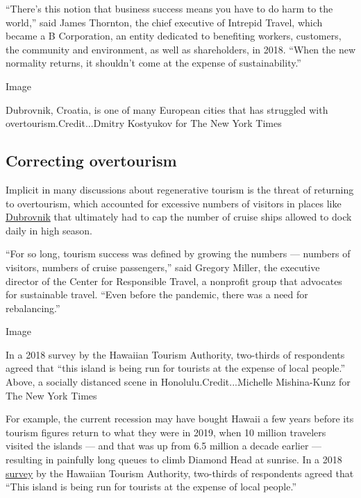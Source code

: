 ``There's this notion that business success means you have to do harm to
the world,'' said James Thornton, the chief executive of Intrepid
Travel, which became a B Corporation, an entity dedicated to benefiting
workers, customers, the community and environment, as well as
shareholders, in 2018. ``When the new normality returns, it shouldn't
come at the expense of sustainability.''

Image

Dubrovnik, Croatia, is one of many European cities that has struggled
with overtourism.Credit...Dmitry Kostyukov for The New York Times

\hypertarget{correcting-overtourism}{%
\subsection{Correcting overtourism}\label{correcting-overtourism}}

Implicit in many discussions about regenerative tourism is the threat of
returning to overtourism, which accounted for excessive numbers of
visitors in places like
\href{https://www.nytimes3xbfgragh.onion/2018/08/19/world/europe/dubrovnik-croatia-game-of-thrones.html}{Dubrovnik}
that ultimately had to cap the number of cruise ships allowed to dock
daily in high season.

``For so long, tourism success was defined by growing the numbers ---
numbers of visitors, numbers of cruise passengers,'' said Gregory
Miller, the executive director of the Center for Responsible Travel, a
nonprofit group that advocates for sustainable travel. ``Even before the
pandemic, there was a need for rebalancing.''

Image

In a 2018 survey by the Hawaiian Tourism Authority, two-thirds of
respondents agreed that ``this island is being run for tourists at the
expense of local people.'' Above, a socially distanced scene in
Honolulu.Credit...Michelle Mishina-Kunz for The New York Times

For example, the current recession may have bought Hawaii a few years
before its tourism figures return to what they were in 2019, when 10
million travelers visited the islands --- and that was up from 6.5
million a decade earlier --- resulting in painfully long queues to climb
Diamond Head at sunrise. In a 2018
\href{https://www.hawaiitourismauthority.org/media/2984/resident-sentiment-presentation-to-hta-board-01-31-2019.pdf}{survey}
by the Hawaiian Tourism Authority, two-thirds of respondents agreed that
``This island is being run for tourists at the expense of local
people.''

